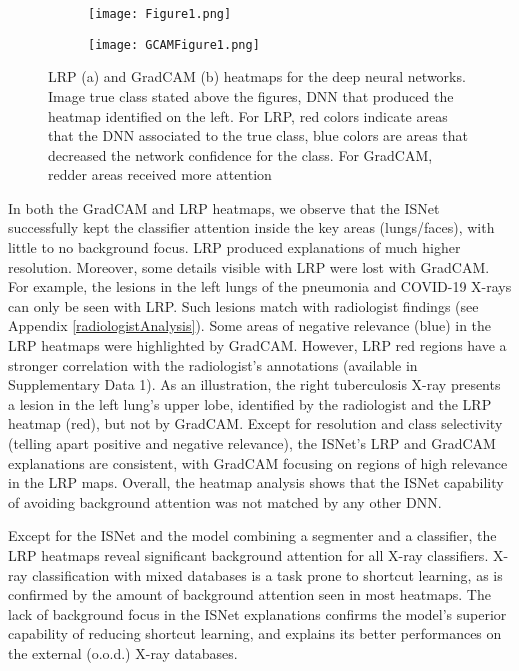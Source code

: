 \documentclass[fleqn,10pt]{wlscirep}
\begin{document}
{\begin{figure}[!h]
     \centering
     \begin{subfigure}[b]{0.65\textwidth}
         \centering
         \texttt{[image: Figure1.png]}
         \caption{}
         \label{maps1}
     \end{subfigure}
     \hfill
     \begin{subfigure}[b]{0.65\textwidth}
         \centering
         \texttt{[image: GCAMFigure1.png]}
         \caption{}
         \label{maps2}
     \end{subfigure}
        \caption{LRP (a) and GradCAM (b) heatmaps for the deep neural networks. Image true class stated above the figures, DNN that produced the heatmap identified on the left. For LRP, red colors indicate areas that the DNN associated to the true class, blue colors are areas that decreased the network confidence for the class. For GradCAM, redder areas received more attention}
        \label{fig:three graphs}
\label{maps}
\end{figure}


In both the GradCAM and LRP heatmaps, we observe that the ISNet successfully kept the classifier attention inside the key areas (lungs/faces), with little to no background focus. LRP produced explanations of much higher resolution. Moreover, some details visible with LRP were lost with GradCAM. For example, the lesions in the left lungs of the pneumonia and COVID-19 X-rays can only be seen with LRP. Such lesions match with radiologist findings (see Appendix \ref{radiologistAnalysis}). Some areas of negative relevance (blue) in the LRP heatmaps were highlighted by GradCAM. However, LRP red regions have a stronger correlation with the radiologist's annotations (available in Supplementary Data 1). As an illustration, the right tuberculosis X-ray presents a lesion in the left lung's upper lobe, identified by the radiologist and the LRP heatmap (red), but not by GradCAM. Except for resolution and class selectivity (telling apart positive and negative relevance), the ISNet's LRP and GradCAM explanations are consistent, with GradCAM focusing on regions of high relevance in the LRP maps. Overall, the heatmap analysis shows that the ISNet capability of avoiding background attention was not matched by any other DNN.

Except for the ISNet and the model combining a segmenter and a classifier, the LRP heatmaps reveal significant background attention for all X-ray classifiers. X-ray classification with mixed databases is a task prone to shortcut learning\cite{ShortcutCovid}, as is confirmed by the amount of background attention seen in most heatmaps. The lack of background focus in the ISNet explanations confirms the model's superior capability of reducing shortcut learning, and explains its better performances on the external (o.o.d.) X-ray databases.

}
\end{document}
